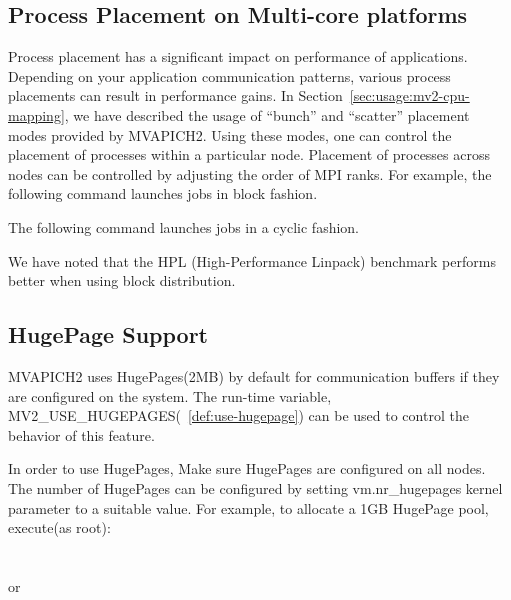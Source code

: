 \subsection{Process Placement on Multi-core platforms}

Process placement has a significant impact on performance of
applications. Depending on your application communication patterns,
various process placements can result in performance gains. In
Section~\ref{sec:usage:mv2-cpu-mapping}, we have described the usage of
``bunch'' and ``scatter'' placement modes provided by MVAPICH2. Using
these modes, one can control the placement of processes within a
particular node. Placement of processes across nodes can be controlled
by adjusting the order of MPI ranks. For example, the following command
launches jobs in block fashion.


The following command launches jobs in a cyclic fashion.


We have noted that the HPL (High-Performance Linpack) benchmark performs
better when using block distribution.

\subsection{HugePage Support}

MVAPICH2 uses HugePages(2MB) by default for communication buffers
if they are configured on the system. The run-time variable, MV2\_USE\_HUGEPAGES(~\ref{def:use-hugepage})
can be used to control the  behavior of this feature.

In order to use HugePages, Make sure HugePages are configured on all
nodes. The number of HugePages can be configured by setting
vm.nr\_hugepages kernel parameter to a suitable value.  For example, to
allocate a 1GB HugePage pool, execute(as root):
\\
\\
 \\
or \\
 \\

